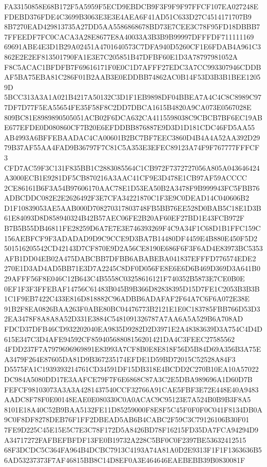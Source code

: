 \documentclass[UTF8,fontset=fandol,zihao=-4,a4paper]{ctexart}
\begin{document}
{{FA33150858E68B172F5A5959F5ECD9EBDCB9F3F9F9F97FFCF107EA027248EFDEBD376FDE4C3699B3063E3E3E4AEA6F41AD51C633D27C4514171707B9
8B7270EAD429813735A27DD5AA5586868678BD73E7CEE3C78F95FD18DBBB77FFEEDF7FC0CACA3A28E8677E8A40033A3B3B9B99997DFFFDF711111169
69691ABE4E3D1B29A02451A4701640573C7DFA940D5260CF1E6FDAB4A961C3862E2E2EF813501790FA1E3E7C205851B47DFBF60E1D3A78797981052A
F8C5ACAC1BFDFB7F69616171F0E0C1D7AFFF27EDC3A7CC993307946CDDBAF5BA75EBA81C286F01B2AAB3E0EDDBB74862AC0B14F53D3B3B1BEE12059D
5BCC313A3A1A021B4217A50132C3D1F1EB9898DF04BBEA7A4C4C8C8989C977DF7D77F5EA55654FE35F58F8C2DD7DBCA1615B4820A9CA073E0567028E
809BC81E8989890505051ACB02F6DCA632CA4115598038C9CBCB7BF6EC19ABE677EFDE0D080860CF7B20E6EFDDBB876887E9D3D1D181CDC46FD5AA55
AB4993A6BFFEBAADAC4CA00601B2BC7BF7EEC3860D4B4A4A52AA392D2979B37AF55AA4FAD9B36797F7C81C5A353E3EFEC89123A74F9F767777FFFCF3
CFD7AC59F3C131F835BB1C2883085564C1CB972F7372727056A805A043646424A3000ECB1E9281DF5CB870216A3AAC41CF9E3D478E1CB97AF59ACCCC
2CE86161B6F3A54B97606170AAC78E1D53EA50B2A3478F9B999943FC5FBB76ADBCDDC082E2E2626492F3E7CFA34221870C1F3E9C0DEAD14C040606B2
D1F10839053AE5AAB000D708270317803748FB5BB76EE528D0BAB5C18E1D3B61E84093D8D858940324B42B57AEC06FE2B20AF60EF27BD1E43FCB972F
B7B5B55DB46811FE28259D6A7E7E3E746393269F4C9A34F1C68D1B1FFC159C156AEBFCF9F3ADADAD9D9C9CCE9D3BA7B14480DF4459E4B880E450F5D2
501516205542CD42143D7CF870E9D2A56CE8190E686F6F3F6AD4E83973BC5353AFB1DD04EB02A475DABCBB7DFBB6ABABEBA041837EFFFD776574EDE2
270E1D3AD4AD5BB71E3D7A2245C8DF0D056FE8E6E6D6B469D369D3A641B029AFFF56F8E046C12B643C4B5558C03258616121F740352B5873E7CE0B0E
0EF1F3F3FFEBAF14756C61483B045B9B366D82838395D15D7FE1C2053B3B3B1C1F9EB7422C433E816D818882C96ADBB6ADAFAF2F64A7C6F6A072E38E
91B2F8EA0826BAA263F0ABE80BC04476773B2121E1E0C183785FBB766D53D32EA3478F8A8A8A52D331E3884C5481091326787A7AA6A5A529B6A708AD
FDCD37DFB46CD932202040EA9835D9282D2D3971E2A48383639D3A754C4D4D615E347C3D4AFE94592CF85940568808156201421DA4C3FEEC27585562
4FDD237F7A7979696969891E83993A7CF8B0E8E818F56D5B84D69A356B3A75EA3479F264E87605DA81D9B367235174EFDE1D59BD72015C52528A84F3
D5575FA1C1939393214761CD34591DF15DB318E4BCDD2C270B10EA10A57022DC984A5080DD17E3AAFCE79F7F6E6868C87A3C2E5DBA989696A1D60D7B
FEFCF98103073A3A3A4281437540CCF32766A91CAE5FBF3E72E448E40A9483AADC8F78F0E00148EAE0E080330C0A0ACAC9C95123E7A524B0B9B3F8A5
8101E18A40C52B9BAA5132FE11D85259000F8E8F5C45F0F0F0C041F8134DB0A9C0F8DF8278DEB76F1FF2DBEAD5AB6B4CABC2F59C3C79126106B30F01
7FE9D225C45E15E5C7E3C78F172D5A8426BD78F16215FD35DA7FCA94294D9A34717272FAFBEFBFDF13FE0B19732A228C5BF0C0F2397BE53632412515
68F3DCDC5C364FA964B4DCBC7913C4193A74A81A0D2E9313F1F1F1363636B56AD53237373F7AF46815BB8C14D8EF0A3E464646EAEBEBB39B0830081F
}}
\end{document}
